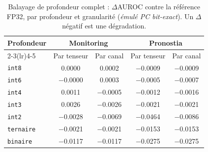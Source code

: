 \begin{table}[htbp]
\centering
\caption{Balayage de profondeur complet : $\Delta$AUROC contre la référence FP32, par profondeur et granularité (\emph{émulé PC bit-exact}). Un $\Delta$ négatif est une dégradation.}
\label{tab:annex-depth}
\begin{tabular}{lcccc}
\toprule
Profondeur & \multicolumn{2}{c}{Monitoring} & \multicolumn{2}{c}{Pronostia} \\
\cmidrule(lr){2-3}\cmidrule(lr){4-5}
 & Par tenseur & Par canal & Par tenseur & Par canal \\
\midrule
\texttt{int8} & \num{0.0000} & \num{0.0002} & \num{-0.0009} & \num{-0.0009} \\
\texttt{int6} & \num{-0.0000} & \num{0.0003} & \num{-0.0005} & \num{-0.0007} \\
\texttt{int4} & \num{0.0011} & \num{-0.0005} & \num{-0.0012} & \num{-0.0016} \\
\texttt{int3} & \num{0.0026} & \num{-0.0026} & \num{-0.0021} & \num{-0.0021} \\
\texttt{int2} & \num{-0.0028} & \num{-0.0069} & \num{-0.0464} & \num{-0.0086} \\
\texttt{ternaire} & \num{-0.0021} & \num{-0.0021} & \num{-0.0153} & \num{-0.0153} \\
\texttt{binaire} & \num{-0.0117} & \num{-0.0117} & \num{-0.0275} & \num{-0.0275} \\
\bottomrule
\end{tabular}
\end{table}
